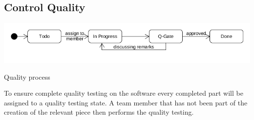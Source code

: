 \subsection{Control Quality}
\begin{table}[!ht]
  \includegraphics[width=\linewidth]{content/diagram/quality/state-quality.png}
  \caption{Quality process}
\end{table}
To ensure complete quality testing on the software every completed part will be assigned to a quality testing state. A team member that has not been part of the creation of the relevant piece then performs the quality testing.